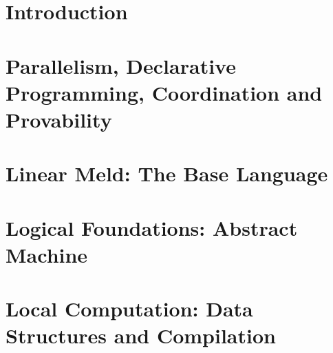\documentclass[12pt]{cmuthesis}
\theoremstyle{indented}
\begin{document}

\thispagestyle{empty}
\clearpage

\frontmatter
\begin{abstract}

\end{abstract}

\begin{acknowledgments}

\end{acknowledgments}

\tableofcontents
\listoffigures
\listoftables
\renewcommand{\listtheoremname}{List of Equations}
\listoftheorems

\mainmatter


%
%
%
%
%

\mainmatter
\chapter{Introduction}


\chapter{Parallelism, Declarative Programming, Coordination and Provability}


\chapter{Linear Meld: The Base Language}\label{chapter:language}


\chapter{Logical Foundations: Abstract Machine}


\chapter{Local Computation: Data Structures and Compilation}\label{chapter:local}

\end{document}
